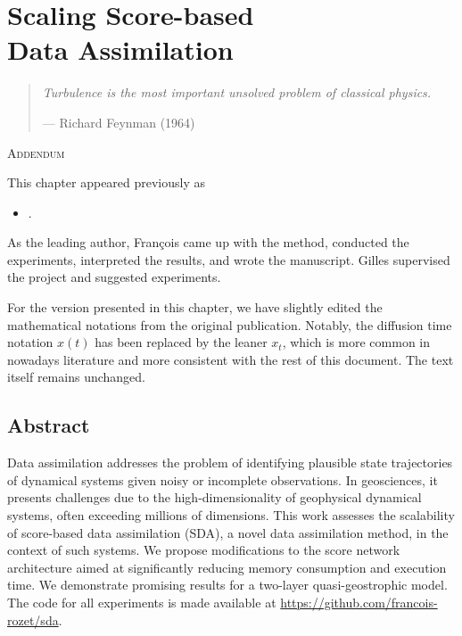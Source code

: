 \chapter[Scaling Score-based Data Assimilation]{Scaling Score-based\\Data Assimilation} \label{chap:sda-2lqg}

\begin{quote}
    \begin{flushright}
        \textit{Turbulence is the most important unsolved problem of classical physics.}

        --- Richard Feynman (1964)
    \end{flushright}
\end{quote}

\vspace{2em}

\begin{addendum}{\Large\scshape Addendum}

This chapter appeared previously as

\begin{itemize}[leftmargin=1em]
    \item[] .
\end{itemize}

As the leading author, François came up with the method, conducted the experiments, interpreted the results, and wrote the manuscript. Gilles supervised the project and suggested experiments.

For the version presented in this chapter, we have slightly edited the mathematical notations from the original publication. Notably, the diffusion time notation $x(t)$ has been replaced by the leaner $x_t$, which is more common in nowadays literature and more consistent with the rest of this document. The text itself remains unchanged.

\end{addendum}

\section*{Abstract}

Data assimilation addresses the problem of identifying plausible state trajectories of dynamical systems given noisy or incomplete observations. In geosciences, it presents challenges due to the high-dimensionality of geophysical dynamical systems, often exceeding millions of dimensions. This work assesses the scalability of score-based data assimilation (SDA), a novel data assimilation method, in the context of such systems. We propose modifications to the score network architecture aimed at significantly reducing memory consumption and execution time. We demonstrate promising results for a two-layer quasi-geostrophic model. The code for all experiments is made available at \url{https://github.com/francois-rozet/sda}.

